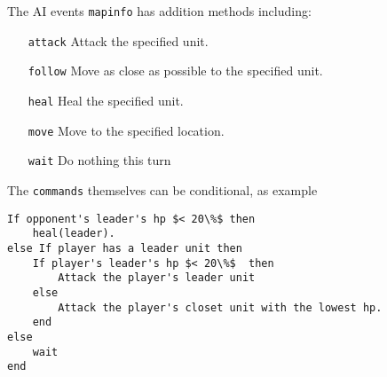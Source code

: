 The AI events \texttt{mapinfo} has addition methods including:
\begin{itemize}
	\item[\texttt{attack}]  Attack the specified unit.
	\item[\texttt{follow}]  Move as close as possible to the specified unit.
	\item[\texttt{heal}]    Heal the specified unit.
	\item[\texttt{move}]    Move to the specified location.
	\item[\texttt{wait}]    Do nothing this turn
\end{itemize}   

\clearpage
The \texttt{commands} themselves can be conditional, as example 
\begin{lstlisting}[caption=Conditional AI Event ]
If opponent's leader's hp $< 20\%$ then
	heal(leader).
else If player has a leader unit then
	If player's leader's hp $< 20\%$  then
	 	Attack the player's leader unit
	else
		Attack the player's closet unit with the lowest hp.
	end
else
	wait
end	
\end{lstlisting}

